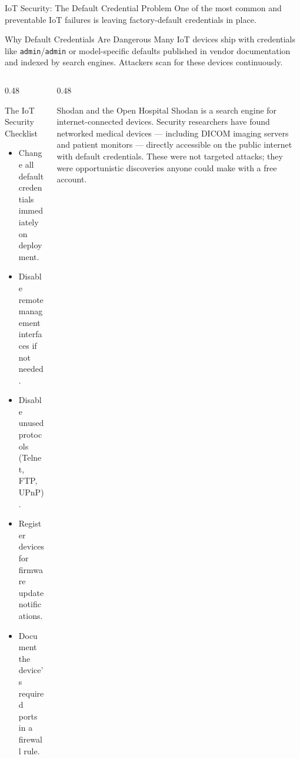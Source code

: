 \documentclass[aspectratio=169]{beamer}  %
\begin{document}

\begin{frame}{IoT Security: The Default Credential Problem}
    \footnotesize
    One of the most common and preventable IoT failures is leaving factory-default credentials in place.

    \begin{alertblock}{Why Default Credentials Are Dangerous}
        \footnotesize
        Many IoT devices ship with credentials like \texttt{admin}/\texttt{admin} or model-specific defaults published in vendor documentation and indexed by search engines. Attackers scan for these devices continuously.
    \end{alertblock}

    \begin{columns}[T]
        \begin{column}{0.48\textwidth}
            \begin{block}{The IoT Security Checklist}
                \footnotesize
                \begin{itemize}
                    \item Change all default credentials immediately on deployment.
                    \item Disable remote management interfaces if not needed.
                    \item Disable unused protocols (Telnet, FTP, UPnP).
                    \item Register devices for firmware update notifications.
                    \item Document the device's required ports in a firewall rule.
                \end{itemize}
            \end{block}
        \end{column}
        \begin{column}{0.48\textwidth}
            \begin{exampleblock}{Shodan and the Open Hospital}
                \footnotesize
                Shodan is a search engine for internet-connected devices. Security researchers have found networked medical devices --- including DICOM imaging servers and patient monitors --- directly accessible on the public internet with default credentials. These were not targeted attacks; they were opportunistic discoveries anyone could make with a free account.
            \end{exampleblock}
        \end{column}
    \end{columns}
\end{frame}
\end{document}
